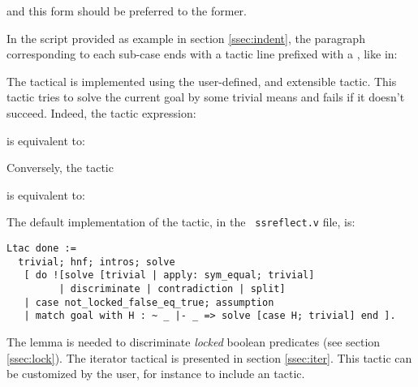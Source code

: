 and this form should be preferred to the former.

In the script provided as example in section \ref{ssec:indent}, the
paragraph corresponding to each sub-case ends with a tactic line prefixed
with a , like in:

\begin{center}
\end{center}


The  tactical is implemented using the user-defined,
and extensible  tactic. This  tactic tries to solve
the current goal by some trivial means and fails if it doesn't succeed.
Indeed, the tactic expression:

\begin{center}
    {\tac}
\end{center}

is equivalent to:

\begin{center}
  {\tac}
\end{center}

Conversely, the tactic

\begin{center}
\end{center}

is equivalent to:

\begin{center}
\end{center}

The default implementation of the  tactic, in the {\tt
  ssreflect.v} file, is:

\begin{lstlisting}
Ltac done :=
  trivial; hnf; intros; solve
   [ do ![solve [trivial | apply: sym_equal; trivial]
         | discriminate | contradiction | split]
   | case not_locked_false_eq_true; assumption
   | match goal with H : ~ _ |- _ => solve [case H; trivial] end ].
\end{lstlisting}

The lemma  is needed to discriminate
\emph{locked} boolean predicates (see section \ref{ssec:lock}).
The iterator tactical  is presented in section
\ref{ssec:iter}.
This tactic can be customized by the user, for instance to include an
 tactic.

